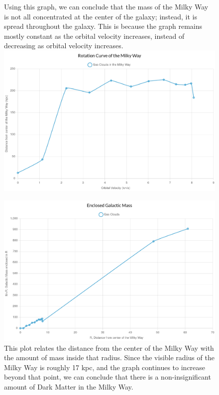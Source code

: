 \documentclass{article}
\begin{document}
\begin{center}
\begin{figure}[h!]
{            Using this graph, we can conclude that the mass of the Milky Way is not all concentrated at the center of the galaxy; instead, it is spread throughout the galaxy.
            This is because the graph remains mostly constant as the orbital velocity increases, instead of decreasing as orbital velocity increases.
            \smallskip
        }
        \includegraphics[scale=0.2]{rotation-curve-lab9.jpg}
        \centering
    \end{figure}
    \pagebreak
    \begin{figure}[h!]
        \caption{
            This plot relates the distance from the center of the Milky Way with the amount of mass inside that radius.
            Since the visible radius of the Milky Way is roughly 17 kpc, and the graph continues to increase beyond that point, we can conclude that there is a non-insignificant amount of Dark Matter in the Milky Way.
            \smallskip
        }
        \includegraphics[scale=0.2]{distance-enclosed-mass.jpg}
        \centering
    \end{figure}
\end{center}
\end{document}
